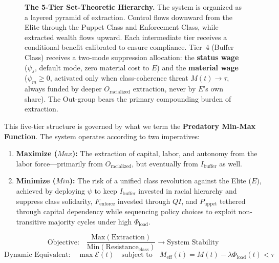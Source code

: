 \begin{figure}[htbp]
\caption{\textbf{The 5-Tier Set-Theoretic Hierarchy.} The system is organized as a layered pyramid of extraction. Control flows downward from the Elite through the Puppet Class and Enforcement Class, while extracted wealth flows upward. Each intermediate tier receives a conditional benefit calibrated to ensure compliance. Tier~4 (Buffer Class) receives a two-mode suppression allocation: the \textbf{status wage} ($\psi_s$, default mode, zero material cost to $E$) and the \textbf{material wage} ($\psi_m \geq 0$, activated only when class-coherence threat $M(t) \to \tau$, always funded by deeper $O_{\text{racialized}}$ extraction, never by $E$'s own share). The Out-group bears the primary compounding burden of extraction.}
\label{fig:elite_model}
\end{figure}

This five-tier structure is governed by what we term the \textbf{Predatory Min-Max Function}. The system operates according to two imperatives:

\begin{enumerate}
    \item \textbf{Maximize ($Max$):} The extraction of capital, labor, and autonomy from the labor force---primarily from $O_{\text{racialized}}$, but eventually from $I_{\text{buffer}}$ as well.
    \item \textbf{Minimize ($Min$):} The risk of a unified class revolution against the Elite ($E$), achieved by deploying $\psi$ to keep $I_{\text{buffer}}$ invested in racial hierarchy and suppress class solidarity, $F_{\text{enforce}}$ invested through $QI$, and $P_{\text{uppet}}$ tethered through capital dependency while sequencing policy choices to exploit non-transitive majority cycles under high $\Phi_{\text{load}}$.
\end{enumerate}

\begin{equation}\label{eq:10.10-system-objective-extraction-ratio}
\text{Objective:} \quad \frac{\text{Max}(\text{Extraction})}{\text{Min}(\text{Resistance}_{\text{class}})} \rightarrow \text{System Stability}
\end{equation}
\begin{equation}\label{eq:10.11-system-stability-algorithm}
\text{Dynamic Equivalent:} \quad \max \mathcal{E}(t) \quad \text{subject to} \quad M_{\text{eff}}(t)=M(t)-\lambda\Phi_{\text{load}}(t)<\tau
\end{equation}

